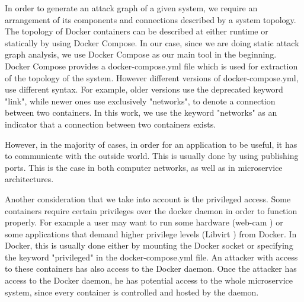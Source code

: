 In order to generate an attack graph of a given system, we require an arrangement of its components and connections described by a system topology. The topology of Docker containers can be described at either runtime or statically by using Docker Compose. In our case, since we are doing static attack graph analysis, we use Docker Compose as our main tool in the beginning. Docker Compose provides a docker-compose.yml file which is used for extraction of the topology of the system. However different versions of docker-compose.yml, use different syntax. For example, older versions use the deprecated keyword "link", while newer ones use exclusively "networks", to denote a connection between two containers. In this work, we use the keyword "networks" as an indicator that a connection between two containers exists.

However, in the majority of cases, in order for an application to be useful, it has to communicate with the outside world. This is usually done by using publishing ports. This is the case in both computer networks, as well as in microservice architectures.

Another consideration that we take into account is the privileged access. Some containers require certain privileges over the docker daemon in order to function properly. For example a user may want to run some hardware (web-cam \cite{webcam}) or some applications that demand higher privilege levels (Libvirt \cite{libvirt}) from Docker. In Docker, this is usually done either by mounting the Docker socket or specifying the keyword "privileged" in the docker-compose.yml file. An attacker with access to these containers has also access to the Docker daemon. Once the attacker has access to the Docker daemon, he has potential access to the whole microservice system, since every container is controlled and hosted by the daemon.

